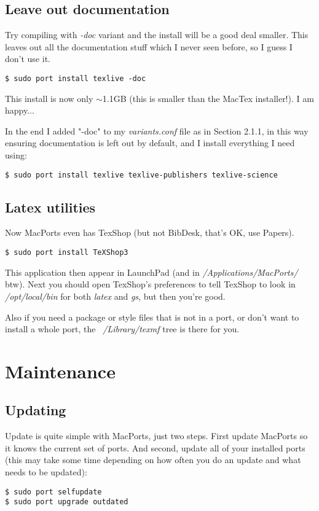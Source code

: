 \documentclass[11pt]{article}
\begin{document}
\subsection{Leave out documentation}
Try compiling with \textit{-doc} variant and the install will be a good deal smaller. This leaves out all the documentation stuff which I never seen before, so I guess I don't use it.
\begin{lstlisting}[style=Bash]
$ sudo port install texlive -doc
\end{lstlisting}
This install is now only $\sim$1.1GB (this is smaller than the MacTex installer!). I am happy...

In the end I added "-doc" to my {\it variants.conf} file as in Section 2.1.1, in this way ensuring documentation is left out by default, and I install everything I need using:
\begin{lstlisting}[style=Bash]
$ sudo port install texlive texlive-publishers texlive-science 
\end{lstlisting}

\subsection{Latex utilities}
Now MacPorts even has TexShop (but not BibDesk, that's OK, use Papers). 
\begin{lstlisting}[style=Bash]
$ sudo port install TeXShop3
\end{lstlisting}
This application then appear in LaunchPad (and in \textit{/Applications/MacPorts/} btw). Next you should open TexShop's preferences to tell TexShop to look in \textit{/opt/local/bin} for both \textit{latex} and \textit{gs}, but then you're good. 

Also if you need a package or style files that is not in a port, or don't want to install a whole port, the \textit{~/Library/texmf} tree is there for you.



%
%
\section{Maintenance}

\subsection{Updating}
Update is quite simple with MacPorts, just two steps. First update MacPorts so it knows the current set of ports. And second, update all of your installed ports (this may take some time depending on how often you do an update and what needs to be updated):
\begin{lstlisting}[style=Bash]
$ sudo port selfupdate
$ sudo port upgrade outdated
\end{lstlisting}
\end{document}
